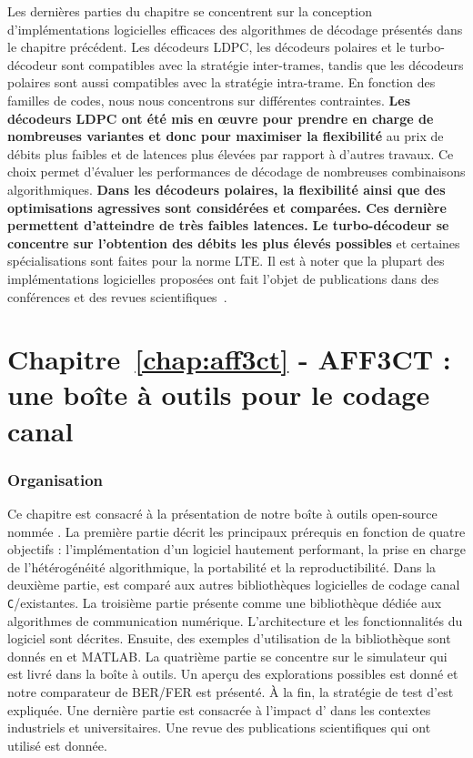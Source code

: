Les dernières parties du chapitre se concentrent sur la conception
d'implémentations logicielles efficaces des algorithmes de décodage présentés
dans le chapitre précédent. Les décodeurs LDPC, les décodeurs polaires et le
turbo-décodeur sont compatibles avec la stratégie inter-trames, tandis que les
décodeurs polaires sont aussi compatibles avec la stratégie intra-trame. En
fonction des familles de codes, nous nous concentrons sur différentes
contraintes. \textbf{Les décodeurs LDPC ont été mis en œuvre pour prendre en
charge de nombreuses variantes et donc pour maximiser la flexibilité} au prix de
débits plus faibles et de latences plus élevées par rapport à d'autres travaux.
Ce choix permet d'évaluer les performances de décodage de nombreuses
combinaisons algorithmiques. \textbf{Dans les décodeurs polaires, la flexibilité
ainsi que des optimisations agressives sont considérées et comparées. Ces
dernière permettent d'atteindre de très faibles latences.} \textbf{Le
turbo-décodeur se concentre sur l'obtention des débits les plus élevés
possibles} et certaines spécialisations sont faites pour la norme LTE. Il est à
noter que la plupart des implémentations logicielles proposées ont fait l'objet
de publications dans des conférences et des revues
scientifiques~\cite{Ghaffari2019,Leonardon2019,Cassagne2015c,Cassagne2016b,
Cassagne2016a}.

\section*{Chapitre~\ref{chap:aff3ct} - AFF3CT : une boîte à outils pour le codage canal}

\subsubsection*{Organisation}

Ce chapitre est consacré à la présentation de notre boîte à outils open-source
nommée \AFFECT. La première partie décrit les principaux prérequis en fonction
de quatre objectifs : l'implémentation d'un logiciel hautement performant, la
prise en charge de l'hétérogénéité algorithmique, la portabilité et la
reproductibilité. Dans la deuxième partie, \AFFECT est comparé aux autres
bibliothèques logicielles de codage canal \verb|C|/\Cxx existantes. La troisième
partie présente \AFFECT comme une bibliothèque dédiée aux algorithmes de
communication numérique. L'architecture et les fonctionnalités du logiciel sont
décrites. Ensuite, des exemples d'utilisation de la bibliothèque sont donnés en
\Cxx et MATLAB\R. La quatrième partie se concentre sur le simulateur \AFFECT qui
est livré dans la boîte à outils. Un aperçu des explorations possibles est donné
et notre comparateur de BER/FER est présenté. À la fin, la stratégie de test
d'\AFFECT est expliquée. Une dernière partie est consacrée à l'impact d'\AFFECT
dans les contextes industriels et universitaires. Une revue des publications
scientifiques qui ont utilisé \AFFECT est donnée.

